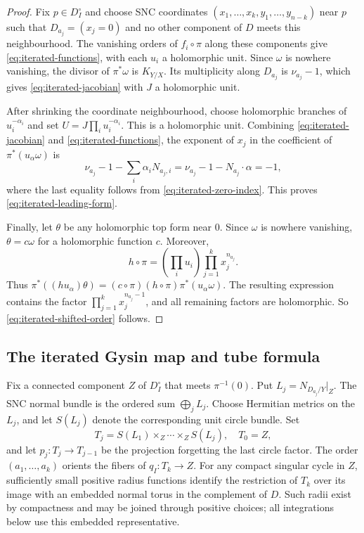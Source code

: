 \documentclass[12pt]{amsart}
\numberwithin{equation}{section}
\theoremstyle{plain}
\theoremstyle{definition}
\theoremstyle{remark}
\theoremstyle{definition}
\begin{document}
\begin{proof}
Fix $p\in D_I^\circ$ and choose SNC coordinates $(x_1,\ldots,x_k,y_1,\ldots,y_{n-k})$ near $p$ such that $D_{a_j}=(x_j=0)$ and no other component of $D$ meets this neighbourhood. The vanishing orders of $f_i\circ\pi$ along these components give \eqref{eq:iterated-functions}, with each $u_i$ a holomorphic unit. Since $\omega$ is nowhere vanishing, the divisor of $\pi^*\omega$ is $K_{Y/X}$. Its multiplicity along $D_{a_j}$ is $\nu_{a_j}-1$, which gives \eqref{eq:iterated-jacobian} with $J$ a holomorphic unit.

After shrinking the coordinate neighbourhood, choose holomorphic branches of $u_i^{-\alpha_i}$ and set $U=J\prod_i u_i^{-\alpha_i}$. This is a holomorphic unit. Combining \eqref{eq:iterated-jacobian} and \eqref{eq:iterated-functions}, the exponent of $x_j$ in the coefficient of $\pi^*(u_\alpha\omega)$ is
\[
\nu_{a_j}-1-\sum_i\alpha_iN_{a_j,i}
=\nu_{a_j}-1-N_{a_j}\cdot\alpha
=-1,
\]
where the last equality follows from \eqref{eq:iterated-zero-index}. This proves \eqref{eq:iterated-leading-form}.

Finally, let $\theta$ be any holomorphic top form near $0$. Since $\omega$ is nowhere vanishing, $\theta=c\omega$ for a holomorphic function $c$. Moreover,
\[
h\circ\pi=\left(\prod_i u_i\right)\prod_{j=1}^k x_j^{n_{a_j}}.
\]
Thus $\pi^*((hu_\alpha)\theta)=(c\circ\pi)(h\circ\pi)\pi^*(u_\alpha\omega)$. The resulting expression contains the factor $\prod_{j=1}^k x_j^{n_{a_j}-1}$, and all remaining factors are holomorphic. So \eqref{eq:iterated-shifted-order} follows.
\end{proof}


\subsection{The iterated Gysin map and tube formula}

Fix a connected component $Z$ of $D_I^\circ$ that meets $\pi^{-1}(0)$. Put $L_j=N_{D_{a_j}/Y}|_Z$. The SNC normal bundle is the ordered sum $\bigoplus_j L_j$. Choose Hermitian metrics on the $L_j$, and let $S(L_j)$ denote the corresponding unit circle bundle. Set
\[
T_j=S(L_1)\times_Z\cdots\times_Z S(L_j),
\quad T_0=Z,
\]
and let $p_j:T_j\to T_{j-1}$ be the projection forgetting the last circle factor. The order $(a_1,\ldots,a_k)$ orients the fibers of $q_I:T_k\to Z$. For any compact singular cycle in $Z$, sufficiently small positive radius functions identify the restriction of $T_k$ over its image with an embedded normal torus in the complement of $D$. Such radii exist by compactness and may be joined through positive choices; all integrations below use this embedded representative.
\end{document}
